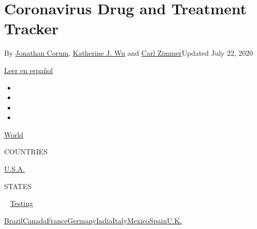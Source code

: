 \hypertarget{coronavirus-drug-and-treatment-tracker}{%
\section{Coronavirus Drug and Treatment
Tracker}\label{coronavirus-drug-and-treatment-tracker}}

By \href{https://www.nytimes3xbfgragh.onion/by/jonathan-corum}{Jonathan
Corum},
\href{https://www.nytimes3xbfgragh.onion/by/katherine-j--wu}{Katherine
J. Wu} and \href{https://www.nytimes3xbfgragh.onion/by/carl-zimmer}{Carl
Zimmer}Updated July 22, 2020

\href{https://www.nytimes3xbfgragh.onion/es/interactive/2020/science/coronavirus-tratamientos-curas.html}{Leer
en español}

\begin{itemize}
\item
\item
\item
\item
\end{itemize}

\href{https://www.nytimes3xbfgragh.onion/interactive/2020/world/coronavirus-maps.html}{World}~

COUNTRIES

\textbar{}
\href{https://www.nytimes3xbfgragh.onion/interactive/2020/us/coronavirus-us-cases.html}{U.S.A.}~

STATES

~
\href{https://www.nytimes3xbfgragh.onion/interactive/2020/us/coronavirus-testing.html}{Testing}

\href{https://www.nytimes3xbfgragh.onion/interactive/2020/world/americas/brazil-coronavirus-cases.html}{Brazil}\href{https://www.nytimes3xbfgragh.onion/interactive/2020/world/canada/canada-coronavirus-cases.html}{Canada}\href{https://www.nytimes3xbfgragh.onion/interactive/2020/world/europe/france-coronavirus-cases.html}{France}\href{https://www.nytimes3xbfgragh.onion/interactive/2020/world/europe/germany-coronavirus-cases.html}{Germany}\href{https://www.nytimes3xbfgragh.onion/interactive/2020/world/asia/india-coronavirus-cases.html}{India}\href{https://www.nytimes3xbfgragh.onion/interactive/2020/world/europe/italy-coronavirus-cases.html}{Italy}\href{https://www.nytimes3xbfgragh.onion/interactive/2020/world/americas/mexico-coronavirus-cases.html}{Mexico}\href{https://www.nytimes3xbfgragh.onion/interactive/2020/world/europe/spain-coronavirus-cases.html}{Spain}\href{https://www.nytimes3xbfgragh.onion/interactive/2020/world/europe/united-kingdom-coronavirus-cases.html}{U.K.}

